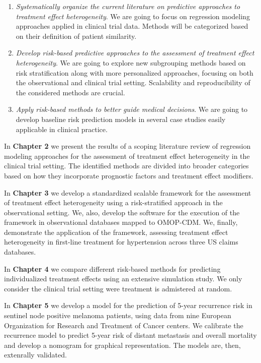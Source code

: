 \documentclass[
]{book}
\providecommand{\tightlist}{%
  \setlength{\itemsep}{0pt}\setlength{\parskip}{0pt}}
\begin{document}
\begin{enumerate}
\def\labelenumi{\arabic{enumi}.}
\tightlist
\item
  \emph{Systematically organize the current literature on predictive approaches to
  treatment effect heterogeneity}. We are going to focus on regression modeling
  approaches applied in clinical trial data. Methods will be categorized based
  on their definition of patient similarity.
\item
  \emph{Develop risk-based predictive approaches to the assessment of treatment
  effect heterogeneity}. We are going to explore new subgrouping methods based
  on risk stratification along with more personalized approaches, focusing on
  both the observational and clinical trial setting. Scalability and
  reproducibility of the considered methods are crucial.
\item
  \emph{Apply risk-based methods to better guide medical decisions}. We are going to
  develop baseline risk prediction models in several case studies easily
  applicable in clinical practice.
\end{enumerate}

In \textbf{Chapter 2} we present the results of a scoping literature review of
regression modeling approaches for the assessment of treatment effect
heterogeneity in the clinical trial setting. The identified methods are divided
into broader categories based on how they incorporate prognostic factors and
treatment effect modifiers.

In \textbf{Chapter 3} we develop a standardized scalable framework for the assessment
of treatment effect heterogeneity using a risk-stratified approach in the
observational setting. We, also, develop the software for the execution of the
framework in observational databases mapped to OMOP-CDM. We, finally,
demonstrate the application of the framework, assessing treatment effect
heterogeneity in first-line treatment for hypertension across three US claims
databases.

In \textbf{Chapter 4} we compare different risk-based methods for predicting
individualized treatment effects using an extensive simulation study. We only
consider the clinical trial setting were treatment is admistered at random.

In \textbf{Chapter 5} we develop a model for the prediction of 5-year recurrence risk
in sentinel node positive melanoma patients, using data from nine European
Organization for Research and Treatment of Cancer centers. We calibrate the
recurrence model to predict 5-year risk of distant metastasis and overall
mortality and develop a nomogram for graphical representation. The models are,
then, extenrally validated.
\end{document}
